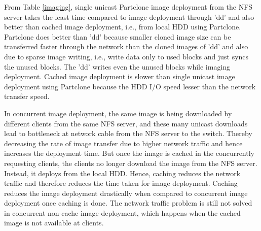\documentclass[a4paper,12pt]{article}
\begin{document}
From Table \ref{imaging}, single unicast Partclone image deployment from the NFS server takes the least time compared to image deployment through 'dd' and also better than cached image deployment, i.e., from local HDD using Partclone. Partclone does better than 'dd' because smaller cloned image size can be transferred faster through the network than the cloned images of 'dd' and also due to sparse image writing, i.e., write data only to used blocks and just syncs the unused blocks. The 'dd' writes even the unused blocks while imaging deployment. Cached image deployment is slower than single unicast image deployment using Partclone because the HDD I/O speed lesser than the network transfer speed. 

In concurrent image deployment, the same image is being downloaded by different clients from the same NFS server, and these many unicast downloads lead to bottleneck at network cable from the NFS server to the switch. Thereby decreasing the rate of image transfer due to higher network traffic and hence increases the deployment time. But once the image is cached in the concurrently requesting clients, the clients no longer download the image from the NFS server. Instead, it deploys from the local HDD. Hence, caching reduces the network traffic and therefore reduces the time taken for image deployment. Caching reduces the image deployment drastically when compared to concurrent image deployment once caching is done. The network traffic problem is still not solved in concurrent non-cache image deployment, which happens when the cached image is not available at clients.  
\end{document}
